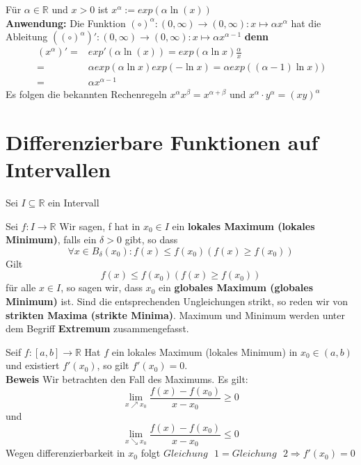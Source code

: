\begin{Bemerkung}{
	Für $\alpha \in \mathbb{R}$ und $x > 0$ ist $x^\alpha := exp(\alpha \ln(x))$ \\
	\textbf{Anwendung:} Die Funktion $\left( \circ \right)^\alpha : 
	(0, \infty) \rightarrow (0, \infty): x \mapsto \alpha x^{\alpha}$ hat die Ableitung 
	$((\circ)^{\alpha})' : (0, \infty) \rightarrow (0, \infty) : 
	x \mapsto \alpha x^{\alpha-1}$
	\textbf{denn} 
	\begin{align*}
	(x^{\alpha})' = & exp'(\alpha \ln(x)) = exp(\alpha\ln x) \frac{\alpha}{x} \\
	= & \alpha exp(\alpha \ln x) exp (-\ln x) =  \alpha exp ((\alpha -1 ) \ln x)) \\
	= & \alpha x^{\alpha-1}
	\end{align*}
	Es folgen die bekannten Rechenregeln $x^{\alpha}x^{\beta} = x^{\alpha+\beta} $
	und $x^\alpha \cdot y^\alpha = (xy)^\alpha$
}\end{Bemerkung}

\section{Differenzierbare Funktionen auf Intervallen}
Sei $I \subseteq \mathbb{R}$ ein Intervall
\begin{Definition}{
	Sei $f: I \rightarrow \mathbb{R}$ Wir sagen, f hat in $x_0 \in I$ ein 
	\textbf{lokales Maximum (lokales Minimum)}, falls ein $\delta > 0$ gibt,
	so dass 
	\begin{equation*}
	\forall x \in B_\delta(x_0) : f(x) \leq f(x_0) (f(x) \geq f(x_0))
	\end{equation*}
	Gilt 
	\begin{equation*}
		f(x) \leq f(x_0) (f(x) \geq f(x_0))
	\end{equation*}
	 für alle $x \in I$, so sagen wir, dass 
	$x_0$ ein \textbf{globales Maximum (globales Minimum)} ist.
	Sind die entsprechenden Ungleichungen strikt, so reden wir von 
	\textbf{strikten Maxima (strikte Minima)}. Maximum und Minimum werden unter dem 
	Begriff \textbf{Extremum} zusammengefasst.
}\end{Definition}

\begin{Satz}{
	\label{satz_8}
	Seif $f:[a,b] \rightarrow \mathbb{R}$ Hat $f$ ein lokales Maximum (lokales 
	Minimum) in $x_0 \in (a,b)$ und existiert $f'(x_0)$, so gilt 
	$f'(x_0) = 0$. \\
	\textbf{Beweis} Wir betrachten den Fall des Maximums.
	Es gilt:
	\begin{equation*}
		\label{gleichung:bedingungi}
		\lim\limits_{x \nearrow x_0}{ \frac{f(x)-f(x_0)}{x-x_0} \geq 0}
	\end{equation*}
	und
	\begin{equation*}
		\label{gleichung:bedingungii}
		\lim\limits_{x \searrow x_0}{\frac{f(x)-f(x_0)}{x-x_0} \leq 0}
	\end{equation*}
	Wegen differenzierbarkeit in $x_0$ folgt
	 $Gleichung\text{ }1 = Gleichung \text{ }2 \Rightarrow 
	f'(x_0) = 0$ 	
}\end{Satz}